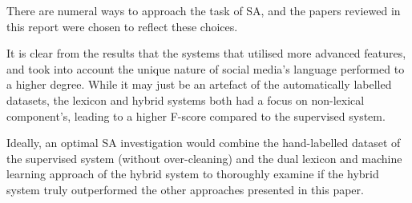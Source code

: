 \documentclass[twocolumn]{article}
\begin{document}
There are numeral ways to approach the task of SA, and the papers reviewed in
this report were chosen to reflect these choices.

It is clear from the results that the systems that utilised more advanced
features, and took into account the unique nature of social media's language
performed to a higher degree.
While it may just be an artefact of the automatically labelled datasets, the
lexicon and hybrid systems both had a focus on non-lexical component's,
leading to a higher F-score compared to the supervised system.

Ideally, an optimal SA investigation would combine the hand-labelled dataset
of the supervised system (without over-cleaning) and the dual lexicon and
machine learning  approach of the hybrid system to thoroughly examine if the
hybrid system truly outperformed the other approaches presented in this paper.



\end{document}
